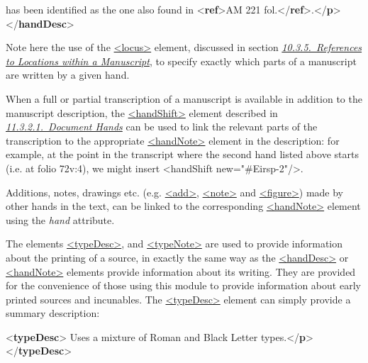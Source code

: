 \begin{shaded}
\hspace*{1em}\hspace*{1em}\hspace*{1em}\hspace*{1em} has been identified as the one also found in {<\textbf{ref}>}AM 221\mbox{}\newline 
\hspace*{1em}\hspace*{1em}\hspace*{1em}\hspace*{1em}\hspace*{1em}\hspace*{1em} fol.{</\textbf{ref}>}.{</\textbf{p}>}\mbox{}\newline 
{}\mbox{}\newline 
{</\textbf{handDesc}>}\end{shaded}\egroup\par \noindent  Note here the use of the \hyperref[TEI.locus]{<locus>} element, discussed in section \textit{\hyperref[msloc]{10.3.5.\ References to Locations within a Manuscript}}, to specify exactly which parts of a manuscript are written by a given hand.\par
When a full or partial transcription of a manuscript is available in addition to the manuscript description, the \hyperref[TEI.handShift]{<handShift>} element described in \textit{\hyperref[PHDH]{11.3.2.1.\ Document Hands}} can be used to link the relevant parts of the transcription to the appropriate \hyperref[TEI.handNote]{<handNote>} element in the description: for example, at the point in the transcript where the second hand listed above starts (i.e. at folio 72v:4), we might insert <handShift new="\#Eirsp-2"/>.\par
Additions, notes, drawings etc. (e.g. \hyperref[TEI.add]{<add>}, \hyperref[TEI.note]{<note>} and \hyperref[TEI.figure]{<figure>}) made by other hands in the text, can be linked to the corresponding \hyperref[TEI.handNote]{<handNote>} element using the {\itshape hand} attribute.\par
The elements \hyperref[TEI.typeDesc]{<typeDesc>}, and \hyperref[TEI.typeNote]{<typeNote>} are used to provide information about the printing of a source, in exactly the same way as the \hyperref[TEI.handDesc]{<handDesc>} or \hyperref[TEI.handNote]{<handNote>} elements provide information about its writing. They are provided for the convenience of those using this module to provide information about early printed sources and incunables. The \hyperref[TEI.typeDesc]{<typeDesc>} element can simply provide a summary description: \par\bgroup{}\exampleFont \begin{shaded}\noindent\mbox{}{<\textbf{typeDesc}>}\mbox{}\newline 
{}Uses a mixture of Roman and Black Letter types.{</\textbf{p}>}\mbox{}\newline 
{</\textbf{typeDesc}>}\end{shaded}\egroup\par \par
